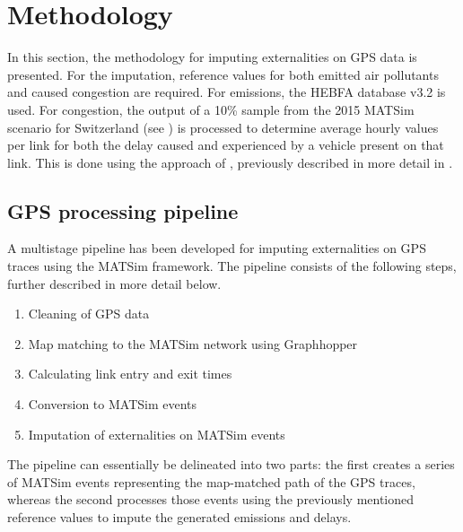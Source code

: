 \section{Methodology}

In this section, the methodology for imputing externalities on GPS data is presented.
For the imputation, reference values for both emitted air pollutants and caused congestion are required.
For emissions, the HEBFA database v3.2 is used. 
For congestion, the output of a 10\% sample from the 2015 MATSim scenario for Switzerland (see ) is processed to determine average hourly values per link for both the delay caused and experienced by a vehicle present on that link. 
This is done using the approach of \citet{kaddoura2015marginal}, previously described in more detail in .

\subsection{GPS processing pipeline}


A multistage pipeline has been developed for imputing externalities on GPS traces using the MATSim framework. 
The pipeline consists of the following steps, further described in more detail below. 

\begin{enumerate}
 	\item Cleaning of GPS data
 	\item Map matching to the MATSim network using Graphhopper
 	\item Calculating link entry and exit times
 	\item Conversion to MATSim events
	\item Imputation of externalities on MATSim events
\end{enumerate}

The pipeline can essentially be delineated into two parts: the first creates a series of MATSim events representing the map-matched path of the GPS traces, whereas the second processes those events using the previously mentioned reference values to impute the generated emissions and delays.

